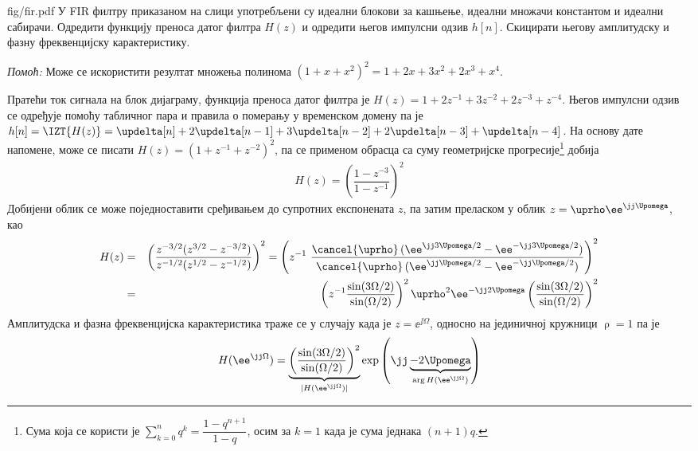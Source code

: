 
\begin{slikaDesno}{fig/fir.pdf}
    \PID У FIR филтру приказаном на слици употребљени су идеални блокови за кашњење, идеални множачи константом и идеални сабирачи.
    Одредити функцију преноса датог филтра $H(z)$ и одредити његов импулсни одзив $h[n]$.
    Скицирати његову амплитудску и фазну фреквенцијску карактеристику.        
\end{slikaDesno}
\textit{Помоћ:} Може се искористити резултат множења полинома $(1 + x + x^2)^2 = 1 + 2x + 3x^2 + 2x^3 + x^4$. 

\RESENJE
Пратећи ток сигнала на блок дијаграму, функција преноса датог филтра је 
$H(z) = 1 + 2 z^{-1} + 3 z^{-2} +  2 z^{-3} + z^{-4}$. Његов импулсни одзив се одређује помоћу 
табличног пара  и правила о померању у временском домену па је 
$h[n] = \IZT{H(z)} = \updelta[n] + 2 \updelta[n-1] + 3\updelta[n-2] + 2\updelta[n-3] + \updelta[n-4]$. 
На основу дате напомене, може се писати $H(z) = (1 + z^{-1} + z^{-2})^2$, па се применом обрасца са суму 
геометријске прогресије\footnote{Сума која се користи је 
$\sum_{k = 0}^n q^k = \dfrac{1 - q^{n+1}}{1 - q}$, осим за  $k = 1$ када је сума једнака $(n+1)q$.
} добија 
\begin{eqnarray}
    H(z) = \left( \dfrac{1 - z^{-3}}{1 - z^{-1}} \right)^2 
\end{eqnarray}
Добијени облик се може поједноставити сређивањем до супротних експонената $z$, па затим преласком 
у облик $z = \uprho \ee^{\jj\Upomega}$, као
\begin{eqnarray}
    H(z) &=& 
    \left( \dfrac{ z^{-3/2} (z^{3/2} - z^{-3/2}) }{ z^{-1/2} (z^{1/2} - z^{-1/2})  } \right)^2
    =
    \left( z^{-1} \,\, \dfrac{ \cancel{\uprho} \, ( \ee^{\jj3\Upomega/2} - \ee^{-\jj3\Upomega/2} ) }{\cancel{\uprho}\,( \ee^{\jj\Upomega/2} - \ee^{-\jj\Upomega/2} )} \right)^2
    \\
    &=&
    \left(
        z^{-1}
        \dfrac{\sin(3\Omega/2)}{\sin(\Omega/2)}
    \right)^2
    \uprho^2 \ee^{-\jj 2\Upomega} 
    \left(
        \dfrac{\sin(3\Omega/2)}{\sin(\Omega/2)}
    \right)^2
\end{eqnarray}
Амплитудска и фазна фреквенцијска карактеристика траже се у случају када је $z = \ee^{\jj\Omega}$, односно на јединичној
кружници $\uprho = 1$ па је 
\begin{eqnarray}
    H(\ee^{\jj\Omega}) = 
    \underbrace{
    \left(
        \dfrac{\sin(3\Omega/2)}{\sin(\Omega/2)}
    \right)^2
    }_{|H(\ee^{\jj\Omega})|}
    \exp\left(\jj 
    \underbrace{-2\Upomega}_{
        \arg H(\ee^{\jj\Omega})
    } \right)
\end{eqnarray}

